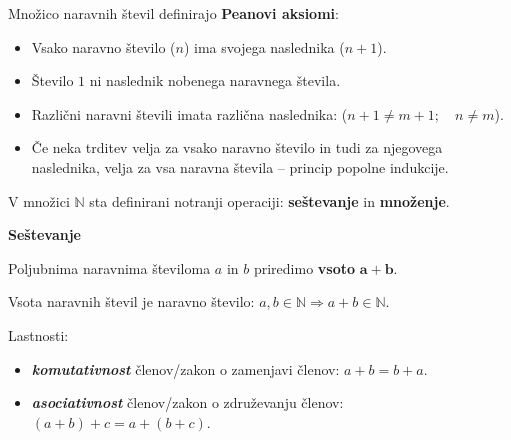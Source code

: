         \begin{frame}
            Množico naravnih števil definirajo \textbf{Peanovi aksiomi}:
            \begin{itemize}
                \item Vsako naravno število ($n$) ima svojega naslednika ($n+1$).
                \item Število $1$ ni naslednik nobenega naravnega števila.
                \item Različni naravni števili imata različna naslednika: ($n+1 \neq m+1;\quad n \neq m$).
                \item Če neka trditev velja za vsako naravno število in tudi za njegovega naslednika, velja za vsa naravna števila -- princip popolne indukcije.
            \end{itemize}
            
            \bigskip
            V množici $\mathbb{N}$ sta definirani notranji operaciji: \textbf{seštevanje} in \textbf{množenje}.
        \end{frame}

        \begin{frame}
            \textbf{\large{Seštevanje}}
            
            \bigskip
            Poljubnima naravnima številoma $a$ in $b$ priredimo \textbf{vsoto} $\mathbf{a+b}$.
            
            \bigskip
            Vsota naravnih števil je naravno število: $a, b \in \mathbb{N} \Rightarrow a+b \in \mathbb{N}$.
            
            \bigskip
            Lastnosti:
            \begin{itemize}
                \item \textit{\textbf{komutativnost}} členov/zakon o zamenjavi členov: $a+b = b+a$.
                \item \textit{\textbf{asociativnost}} členov/zakon o združevanju členov: $(a+b)+c = a+(b+c)$.
            \end{itemize}

        \end{frame}

